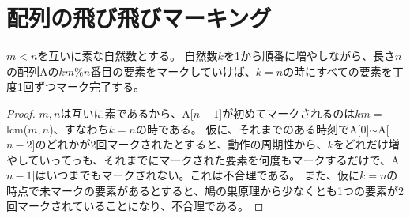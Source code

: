     \section{配列の飛び飛びマーキング}
        \begin{shadebox}
            $m<n$を互いに素な自然数とする。
            自然数$k$を1から順番に増やしながら、長さ$n$の配列Aの$km\%n$番目の要素をマークしていけば、$k=n$の時にすべての要素を丁度1回ずつマーク完了する。
        \end{shadebox}
        \begin{proof}
            \quad\par
            $m,n$は互いに素であるから、A[$n-1$]が初めてマークされるのは$km=$lcm($m,n$)、すなわち$k=n$の時である。
            仮に、それまでのある時刻でA[0]$\sim$A[$n-2$]のどれかが2回マークされたとすると、動作の周期性から、$k$をどれだけ増やしていってっも、それまでにマークされた要素を何度もマークするだけで、A[$n-1$]はいつまでもマークされない。これは不合理である。
            また、仮に$k=n$の時点で未マークの要素があるとすると、鳩の巣原理から少なくとも1つの要素が2回マークされていることになり、不合理である。
        \end{proof}